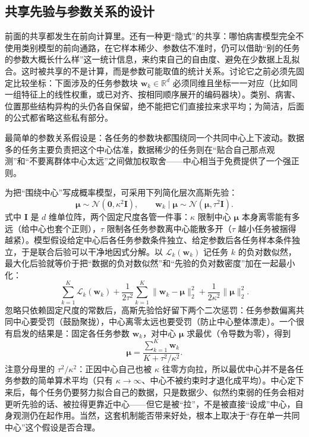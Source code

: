 \subsection{共享先验与参数关系的设计}
\label{sec:ket-sharing-prior}

前面的共享都发生在前向计算里。还有一种更“隐式”的共享：哪怕病害模型完全不使用类别模型的前向通路，在它样本稀少、参数估不准时，仍可以借助“别的任务的参数大概长什么样”这一统计信息，来约束自己的自由度、避免在少数据上乱拟合。这时被共享的不是计算，而是参数可能取值的统计关系。讨论它之前必须先固定比较坐标：下面涉及的任务参数块 $\bm w_k\in\mathbb R^d$ 必须同维且坐标一一对应（比如同一组特征上的线性权重，或已对齐、按相同顺序展开的编码器块）。类别、病害、位置那些结构异构的头仍各自保留，绝不能把它们直接拉来求平均；为简洁，后面的公式都省略这些私有部分。

最简单的参数关系假设是：各任务的参数块都围绕同一个共同中心上下波动。数据多的任务主要负责把这个中心估准，数据稀少的任务则在“贴合自己那点观测”和“不要离群体中心太远”之间做加权取舍——中心相当于免费提供了一个强正则。

为把“围绕中心”写成概率模型，可采用下列简化层次高斯先验：
\begin{equation}
  \bm\mu\sim\mathcal N(\bm0,\kappa^2\bm I),
  \qquad
  \bm w_k\mid\bm\mu\sim
  \mathcal N(\bm\mu,\tau^2\bm I).
  \label{eq:ket-sharing-hierarchical-prior}
\end{equation}
式中 $\bm I$ 是 $d$ 维单位阵，两个固定尺度各管一件事：$\kappa$ 限制中心 $\bm\mu$ 本身离零能有多远（给中心也套个正则），$\tau$ 限制各任务参数离中心能散多开（$\tau$ 越小任务被捆得越紧）。模型假设给定中心后各任务参数条件独立、给定参数后各任务样本条件独立，于是联合后验可以干净地因式分解。以 $\mathcal L_k(\bm w_k)$ 记任务 $k$ 的负对数似然，最大化后验就等价于把“数据的负对数似然”和“先验的负对数密度”加在一起最小化：
\begin{equation}
  \sum_{k=1}^{K}\mathcal L_k(\bm w_k)
  +\frac{1}{2\tau^2}\sum_{k=1}^{K}
     \|\bm w_k-\bm\mu\|_2^2
  +\frac{1}{2\kappa^2}\|\bm\mu\|_2^2.
  \label{eq:ket-sharing-hierarchical-map}
\end{equation}
忽略只依赖固定尺度的常数后，高斯先验恰好留下两个二次惩罚：任务参数偏离共同中心要受罚（鼓励聚拢），中心离零太远也要受罚（防止中心整体漂走）。一个很有启发的结果是：固定各任务参数 $\bm w_k$，对中心 $\bm\mu$ 求最优（令导数为零），得到
\begin{equation}
  \bm\mu
  =\frac{\sum_{k=1}^{K}\bm w_k}
    {K+\tau^2/\kappa^2}.
\end{equation}
注意分母里的 $\tau^2/\kappa^2$：正因中心自己也被 $\kappa$ 往零方向拉，所以最优中心并不是各任务参数的简单算术平均（只有 $\kappa\to\infty$、中心不被约束时才退化成平均）。中心定下来后，每个任务仍要努力拟合自己的数据，只是数据少、似然约束弱的任务会相对更听先验的话、被拉得更靠近中心——但它是被“拉”，不是被直接“设成”中心，自身观测仍在起作用。当然，这套机制能否带来好处，根本上取决于“存在单一共同中心”这个假设是否合理。

